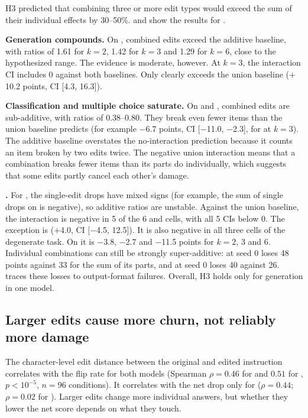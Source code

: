 H3 predicted that combining three or more edit types would exceed the sum of their individual effects by 30--50\%.  and  show the results for \qwen.

{\bf Generation compounds.} On \squad, combined edits exceed the additive baseline, with ratios of 1.61 for $k=2$, 1.42 for $k=3$ and 1.29 for $k=6$, close to the hypothesized range. The evidence is moderate, however. At $k=3$, the interaction CI includes 0 against both baselines. Only  clearly exceeds the union baseline ($+$10.2 points, CI [4.3, 16.3]).

{\bf Classification and multiple choice saturate.} On \agnews and \arc, combined edits are sub-additive, with ratios of 0.38--0.80. They break even fewer items than the union baseline predicts (for example $-$6.7 points, CI [$-$11.0, $-$2.3], for \agnews at $k=3$). The additive baseline overstates the no-interaction prediction because it counts an item broken by two edits twice. The negative union interaction means that a combination breaks fewer items than its parts do individually, which suggests that some edits partly cancel each other's damage.

{\bf \llama.} For \llama, the single-edit drops have mixed signs (for example, the sum of single drops on \sst is negative), so additive ratios are unstable. Against the union baseline, the interaction is negative in 5 of the 6 \sst and \squad cells, with all 5 CIs below 0. The exception is \sst {} ($+$4.0, CI [$-$4.5, 12.5]). It is also negative in all three cells of the degenerate \agnews task. On \arc it is $-$3.8, $-$2.7 and $-$11.5 points for $k = 2$, 3 and 6. Individual \arc combinations can still be strongly super-additive:  at seed 0 loses 48 points against 33 for the sum of its parts, and  at seed 0 loses 40 against 26.  traces these losses to output-format failures. Overall, H3 holds only for generation in one model.

\subsection{Larger edits cause more churn, not reliably more damage}
\label{sec:magnitude}


The character-level edit distance between the original and edited instruction correlates with the flip rate for both models (Spearman $\rho = 0.46$ for \qwen and $0.51$ for \llama, $p < 10^{-5}$, $n = 96$ conditions). It correlates with the net drop only for \qwen ($\rho = 0.44$; $\rho = 0.02$ for \llama). Larger edits change more individual answers, but whether they lower the net score depends on what they touch.
